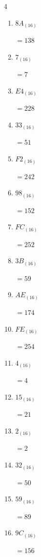 \begin{multicols}{4}
\begin{enumerate}
        $=209$

  \item $8A_{(16)}$

        $=138$

  \item $7_{(16)}$

        $=7$

  \item $E4_{(16)}$

        $=228$

  \item $33_{(16)}$

        $=51$

  \item $F2_{(16)}$

        $=242$

  \item $98_{(16)}$

        $=152$

  \item $FC_{(16)}$

        $=252$

  \item $3B_{(16)}$

        $=59$

\columnbreak %

  \item $AE_{(16)}$

        $=174$

  \item $FE_{(16)}$

        $=254$

  \item $4_{(16)}$

        $=4$

  \item $15_{(16)}$

        $=21$

  \item $2_{(16)}$

        $=2$

  \item $32_{(16)}$

        $=50$

  \item $59_{(16)}$

        $=89$

  \item $9C_{(16)}$

        $=156$


\end{enumerate}
\end{multicols}

